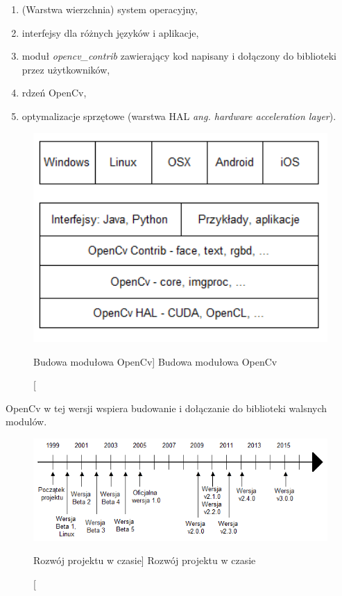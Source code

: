 \documentclass[a4paper,12pt]{article}
\begin{document}
                \begin{spacing}{1}
    				\begin{enumerate}
    					\item (Warstwa wierzchnia) system operacyjny,
    					\item interfejsy dla różnych języków i aplikacje,
    					\item moduł \textit {opencv\_contrib} zawierający kod napisany i dołączony do biblioteki przez użytkowników,
    					\item rdzeń OpenCv,
    					\item optymalizacje sprzętowe (warstwa HAL \textit {ang. hardware acceleration layer}).
    				\end{enumerate} 
                \end{spacing}
            
				\begin{figure}[!ht]  
					\begin{center}
						\includegraphics[width=12cm] {image//openCvBudowa.png} 
					\end{center}
					\caption
					    [Budowa modułowa OpenCv]
					    {Budowa modułowa OpenCv}
				\end{figure}

				\par OpenCv w tej wersji wspiera budowanie i dołączanie do biblioteki walsnych modulów.
	            
				\begin{figure}[!ht]   
					\begin{center}
		    				\includegraphics[width=\linewidth] {image//osCzasu.png} 
					\end{center}
					\caption
					    [Rozwój projektu w czasie]  
					    {Rozwój projektu w czasie}  
				\end{figure}
\end{document}
